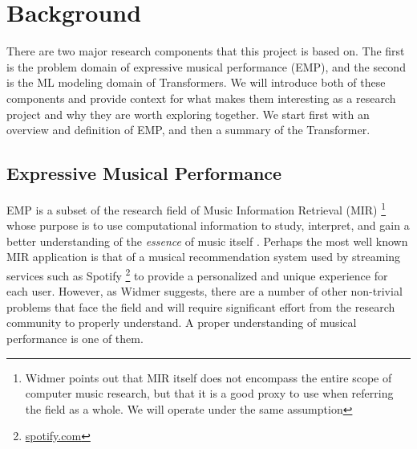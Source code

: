 \chapter{Background}\label{ch:ch2}


There are two major research components that this project is based on. The first is the problem domain of expressive musical performance (EMP), and the second is the ML modeling domain of Transformers. We will introduce both of these components and provide context for what makes them interesting as a research project and why they are worth exploring together. We start first with an overview and definition of EMP, and then a summary of the Transformer. 

\section{Expressive Musical Performance}
EMP is a subset of the research field of Music Information Retrieval (MIR) \footnote{Widmer\cite{widmer2016getting} points out that MIR itself does not encompass the entire scope of computer music research, but that it is a good proxy to use when referring the field as a whole. We will operate under the same assumption} whose purpose is to use computational information to study, interpret, and gain a better understanding of the \emph{essence} of music itself \cite{widmer2016getting}. Perhaps the most well known MIR application is that of a musical recommendation system used by streaming services such as Spotify \footnote{\url{spotify.com}} to provide a personalized and unique experience for each user. However, as Widmer \cite{widmer2016getting} suggests, there are a number of other non-trivial problems that face the field and will require significant effort from the research community to properly understand. A proper understanding of musical performance is one of them. 

